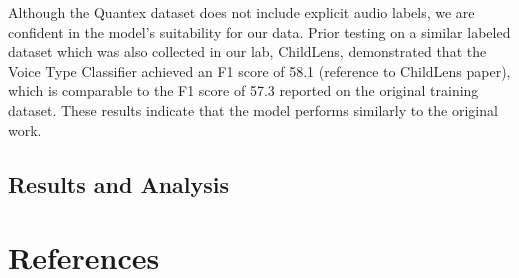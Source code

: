 \documentclass[
  man,floatsintext]{apa6}
\begin{document}
Although the Quantex dataset does not include explicit audio labels, we are confident in the model's suitability for our data. Prior testing on a similar labeled dataset which was also collected in our lab, ChildLens, demonstrated that the Voice Type Classifier achieved an F1 score of 58.1 (reference to ChildLens paper), which is comparable to the F1 score of 57.3 reported on the original training dataset. These results indicate that the model performs similarly to the original work.

\subsection{Results and Analysis}\label{sup-results}

\newpage

\section{References}\label{references-1}

\begingroup
\setlength{\parindent}{-0.5in}
\setlength{\leftskip}{0.5in}
\end{document}
